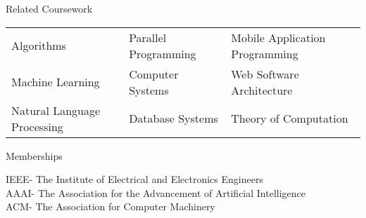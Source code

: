 \documentclass{resume}
\begin{document}
\begin{rSection}{Related Coursework}
\begin{tabularx}{\textwidth}{ X X X }
Algorithms & Parallel Programming & Mobile Application Programming \\
Machine Learning & Computer Systems & Web Software Architecture \\
Natural Language Processing & Database Systems & Theory of Computation
\end{tabularx}

\end{rSection}


\begin{rSection}{Memberships}

IEEE- The Institute of Electrical and Electronics Engineers \\
AAAI- The Association for the Advancement of Artificial Intelligence \\
ACM- The Association for Computer Machinery

\end{rSection}
\end{document}
